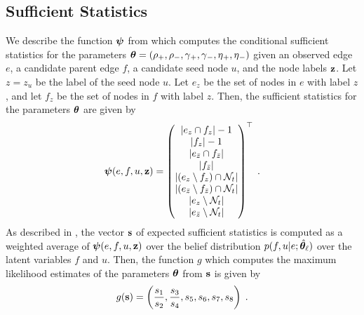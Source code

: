 \documentclass[aps,pre,reprint,superscriptaddress,nofootinbib]{revtex4-2}
\begin{document}
    \subsection{Sufficient Statistics}
        We describe the function $\boldsymbol{\psi}$ from  which computes the conditional sufficient statistics for the parameters $\boldsymbol{\theta} = (\rho{}_+, \rho{}_-, \gamma{}_+, \gamma{}_-, \eta{}_+, \eta{}_-)$ given an observed edge $e$, a candidate parent edge $f$, a candidate seed node $u$, and the node labels $\mathbf{z}$. 
        Let $z = z_u$ be the label of the seed node $u$. 
        Let $e_z$ be the set of nodes in $e$ with label $z$, and let $f_z$ be the set of nodes in $f$ with label $z$. 
        Then, the sufficient statistics for the parameters $\boldsymbol{\theta}$ \cite{degrootProbabilityStatistics2012}  are given by
        \begin{align*}
            \boldsymbol{\psi}(e, f, u, \mathbf{z}) = \begin{pmatrix}
                \left| e_z \cap f_z \right| - 1 \\ 
                \left| f_z \right| - 1 \\ 
                \left| e_{\bar{z}} \cap f_{\bar{z}} \right| \\
                \left| f_{\bar{z}} \right|  \\ 
                \left| (e_z \setminus f_z) \cap \mathcal{N}_{t} \right| \\ 
                \left| (e_{\bar{z}} \setminus f_{\bar{z}})\cap \mathcal{N}_{t} \right| \\
                \left| e_z \setminus \mathcal{N}_{t} \right| \\
                \left| e_{\bar{z}} \setminus \mathcal{N}_{t} \right|
            \end{pmatrix}^\top \;.
        \end{align*}
        As described in , the vector $\mathbf{s}$ of expected sufficient statistics is computed as a weighted average of $\boldsymbol{\psi}(e, f, u, \mathbf{z})$ over the belief distribution $p(f, u | e; \hat{\boldsymbol{\theta}}_{\ell})$ over the latent variables $f$ and $u$.
        Then, the function $g$ which computes the maximum likelihood estimates of the parameters $\boldsymbol{\theta}$ from $\mathbf{s}$ is given by
        \begin{align*}
            g(\mathbf{s}) = \left( 
                \frac{s_1}{s_2}, 
                \frac{s_3}{s_4}, 
                s_5, 
                s_6, 
                s_7, 
                s_8
             \right)
             \;.
        \end{align*}
\end{document}
